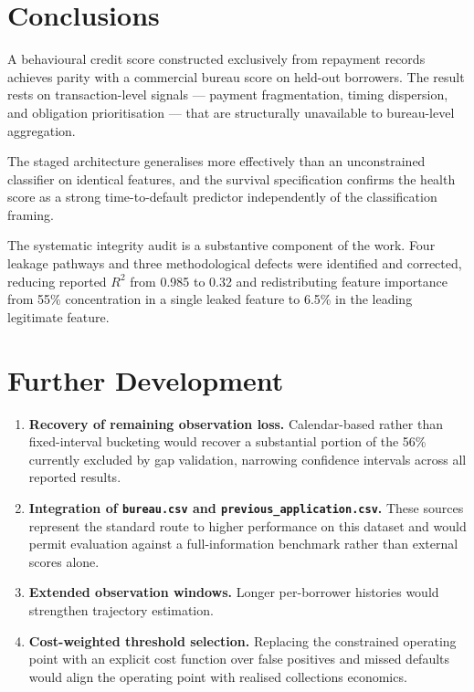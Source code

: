 \documentclass[11pt,a4paper]{article}
\begin{document}
\section{Conclusions}

A behavioural credit score constructed exclusively from repayment records achieves parity
with a commercial bureau score on held-out borrowers. The result rests on
transaction-level signals --- payment fragmentation, timing dispersion, and obligation
prioritisation --- that are structurally unavailable to bureau-level aggregation.

The staged architecture generalises more effectively than an unconstrained classifier on
identical features, and the survival specification confirms the health score as a strong
time-to-default predictor independently of the classification framing.

The systematic integrity audit is a substantive component of the work. Four leakage
pathways and three methodological defects were identified and corrected, reducing
reported $R^2$ from 0.985 to 0.32 and redistributing feature importance from 55\%
concentration in a single leaked feature to 6.5\% in the leading legitimate feature.

\section{Further Development}

\begin{enumerate}[leftmargin=1.6em]
\item \textbf{Recovery of remaining observation loss.} Calendar-based rather than
fixed-interval bucketing would recover a substantial portion of the 56\% currently
excluded by gap validation, narrowing confidence intervals across all reported results.

\item \textbf{Integration of \texttt{bureau.csv} and \texttt{previous\_\allowbreak application.csv}.}
These sources represent the standard route to higher performance on this dataset and
would permit evaluation against a full-information benchmark rather than external scores
alone.

\item \textbf{Extended observation windows.} Longer per-borrower histories would
strengthen trajectory estimation.

\item \textbf{Cost-weighted threshold selection.} Replacing the constrained operating
point with an explicit cost function over false positives and missed defaults would align
the operating point with realised collections economics.
\end{enumerate}
\end{document}
